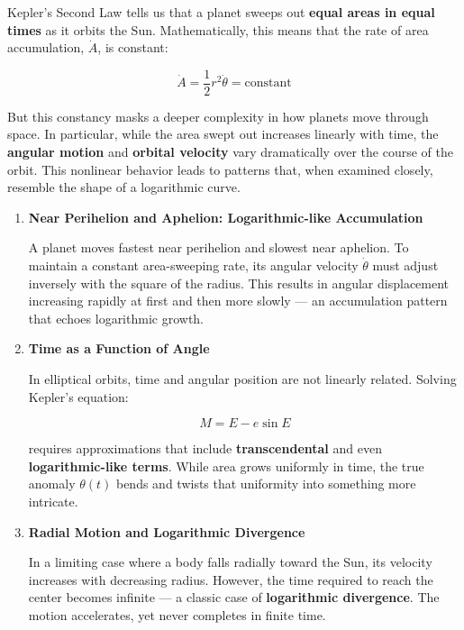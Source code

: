 \medskip

Kepler’s Second Law tells us that a planet sweeps out \textbf{equal areas in equal times} as it orbits the Sun. Mathematically, this means that the rate of area accumulation, \( \dot{A} \), is constant:

\[
\dot{A} = \frac{1}{2} r^2 \dot{\theta} = \text{constant}
\]

But this constancy masks a deeper complexity in how planets move through space. In particular, while the area swept out increases linearly with time, the \textbf{angular motion} and \textbf{orbital velocity} vary dramatically over the course of the orbit. This nonlinear behavior leads to patterns that, when examined closely, resemble the shape of a logarithmic curve.

\begin{enumerate}
    \item \textbf{Near Perihelion and Aphelion: Logarithmic-like Accumulation}

    A planet moves fastest near perihelion and slowest near aphelion. To maintain a constant area-sweeping rate, its angular velocity \( \dot{\theta} \) must adjust inversely with the square of the radius. This results in angular displacement increasing rapidly at first and then more slowly — an accumulation pattern that echoes logarithmic growth.

    \item \textbf{Time as a Function of Angle}

    In elliptical orbits, time and angular position are not linearly related. Solving Kepler’s equation:

    \[
    M = E - e \sin E
    \]

    requires approximations that include \textbf{transcendental} and even \textbf{logarithmic-like terms}. While area grows uniformly in time, the true anomaly \( \theta(t) \) bends and twists that uniformity into something more intricate.

    \item \textbf{Radial Motion and Logarithmic Divergence}

    In a limiting case where a body falls radially toward the Sun, its velocity increases with decreasing radius. However, the time required to reach the center becomes infinite — a classic case of \textbf{logarithmic divergence}. The motion accelerates, yet never completes in finite time.
\end{enumerate}

\medskip

